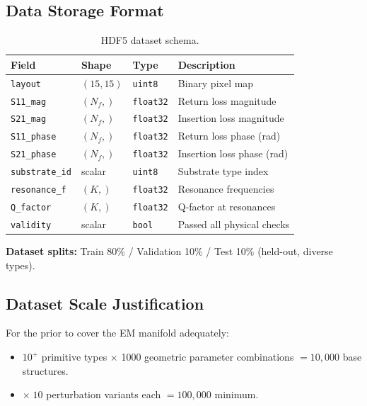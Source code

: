 \documentclass[12pt,a4paper]{article}
\theoremstyle{definition}
\theoremstyle{plain}
\theoremstyle{remark}
\begin{document}
\subsection{Data Storage Format}

\begin{table}[H]
\centering
\caption{HDF5 dataset schema.}
\label{tab:data_schema}
\begin{tabular}{llll}
\toprule
\textbf{Field} & \textbf{Shape} & \textbf{Type} & \textbf{Description} \\
\midrule
\texttt{layout}         & $(15,15)$   & \texttt{uint8}   & Binary pixel map \\
\texttt{S11\_mag}       & $(N_f,)$    & \texttt{float32} & Return loss magnitude \\
\texttt{S21\_mag}       & $(N_f,)$    & \texttt{float32} & Insertion loss magnitude \\
\texttt{S11\_phase}     & $(N_f,)$    & \texttt{float32} & Return loss phase (rad) \\
\texttt{S21\_phase}     & $(N_f,)$    & \texttt{float32} & Insertion loss phase (rad) \\
\texttt{substrate\_id}  & scalar      & \texttt{uint8}   & Substrate type index \\
\texttt{resonance\_f}   & $(K,)$      & \texttt{float32} & Resonance frequencies \\
\texttt{Q\_factor}      & $(K,)$      & \texttt{float32} & Q-factor at resonances \\
\texttt{validity}       & scalar      & \texttt{bool}    & Passed all physical checks \\
\bottomrule
\end{tabular}
\end{table}

\textbf{Dataset splits:} Train 80\% / Validation 10\% / Test 10\% (held-out, diverse types).

\subsection{Dataset Scale Justification}

For the prior to cover the EM manifold adequately:
\begin{itemize}
  \item $10^+$ primitive types $\times$ 1000 geometric parameter combinations
        $= 10{,}000$ base structures.
  \item $\times\;10$ perturbation variants each $= 100{,}000$ minimum.
\end{itemize}
\end{document}
